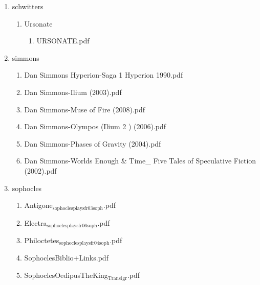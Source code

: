 \documentclass[11pt]{article}
\begin{document}
\begin{enumerate}
\item schwitters
\label{sec-1-1-1-1-28-26}
\begin{enumerate}
\item Ursonate
\label{sec-1-1-1-1-28-26-1}
\begin{enumerate}
\item URSONATE.pdf
\label{sec-1-1-1-1-28-26-1-1}
\end{enumerate}
\end{enumerate}

\item simmons
\label{sec-1-1-1-1-28-27}
\begin{enumerate}
\item Dan Simmons Hyperion-Saga 1 Hyperion  1990.pdf
\label{sec-1-1-1-1-28-27-1}

\item Dan Simmons-Ilium (2003).pdf
\label{sec-1-1-1-1-28-27-2}

\item Dan Simmons-Muse of Fire (2008).pdf
\label{sec-1-1-1-1-28-27-3}

\item Dan Simmons-Olympos (Ilium 2 ) (2006).pdf
\label{sec-1-1-1-1-28-27-4}

\item Dan Simmons-Phases of Gravity (2004).pdf
\label{sec-1-1-1-1-28-27-5}

\item Dan Simmons-Worlds Enough \& Time\_ Five Tales of Speculative Fiction (2002).pdf
\label{sec-1-1-1-1-28-27-6}
\end{enumerate}

\item sophocles
\label{sec-1-1-1-1-28-28}
\begin{enumerate}
\item Antigone$_{\text{sophoclesplaysfr03soph}}$.pdf
\label{sec-1-1-1-1-28-28-1}

\item Electra$_{\text{sophoclesplaysfr06soph}}$.pdf
\label{sec-1-1-1-1-28-28-2}

\item Philoctetes$_{\text{sophoclesplaysfr04soph}}$.pdf
\label{sec-1-1-1-1-28-28-3}

\item SophoclesBiblio+Links.pdf
\label{sec-1-1-1-1-28-28-4}

\item SophoclesOedipusTheKing$_{\text{Transl}}$$_{\text{gr}}$.pdf
\label{sec-1-1-1-1-28-28-5}


\end{enumerate}
\end{enumerate}
\end{document}
